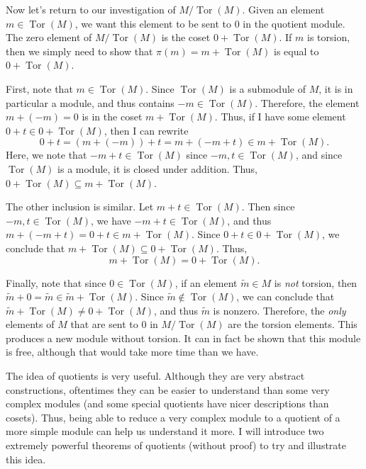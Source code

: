 Now let's return to our investigation of $M / \operatorname{Tor} (M)$. Given an element $m\in \operatorname{Tor} (M)$, we want this element to be sent to 0 in the quotient module. The zero element of $M / \operatorname{Tor} (M)$ is the coset $0+\operatorname{Tor} (M)$. If $m$ is torsion, then we simply need to show that $\pi (m) = m+\operatorname{Tor} (M)$ is equal to $0+\operatorname{Tor} (M)$.

First, note that $m\in \operatorname{Tor} (M)$. Since $\operatorname{Tor} (M)$ is a submodule of $M$, it is in particular a module, and thus contains $-m\in \operatorname{Tor} (M)$. Therefore, the element $m+(-m) = 0$ is in the coset $m+\operatorname{Tor} (M)$. Thus, if I have some element $0+t\in 0+\operatorname{Tor} (M)$, then I can rewrite
\[
	0+t = (m+(-m))+t = m+(-m + t)\in m + \operatorname{Tor} (M)
.\]
Here, we note that $-m+t\in \operatorname{Tor} (M)$ since $-m,t\in \operatorname{Tor} (M)$, and since $\operatorname{Tor} (M)$ is a module, it is closed under addition. Thus, $0+\operatorname{Tor} (M) \subseteq m+ \operatorname{Tor} (M)$.

The other inclusion is similar. Let $m+t\in \operatorname{Tor} (M)$. Then since $-m,t\in \operatorname{Tor} (M)$, we have $-m+t\in \operatorname{Tor} (M)$, and thus $m+(-m+t) = 0+t\in m+\operatorname{Tor} (M)$. Since $0+t\in 0+\operatorname{Tor} (M)$, we conclude that $m+\operatorname{Tor} (M)\subseteq 0+\operatorname{Tor} (M)$. Thus,
\[
	m+\operatorname{Tor} (M) = 0+\operatorname{Tor} (M)
.\]

Finally, note that since $0\in \operatorname{Tor} (M)$, if an element $\widetilde{m} \in M$ is \emph{not} torsion, then $\widetilde{m} +0 = \widetilde{m} \in \widetilde{m} + \operatorname{Tor} (M)$. Since $\widetilde{m} \notin \operatorname{Tor} (M)$, we can conclude that $\widetilde{m} +\operatorname{Tor} (M) \neq 0+\operatorname{Tor} (M)$, and thus $\widetilde{m} $ is nonzero. Therefore, the \emph{only} elements of $M$ that are sent to 0 in $M/\operatorname{Tor} (M)$ are the torsion elements. This produces a new module without torsion. It can in fact be shown that this module is free, although that would take more time than we have.

The idea of quotients is very useful. Although they are very abstract constructions, oftentimes they can be easier to understand than some very complex modules (and some special quotients have nicer descriptions than cosets). Thus, being able to reduce a very complex module to a quotient of a more simple module can help us understand it more. I will introduce two extremely powerful theorems of quotients (without proof) to try and illustrate this idea.

